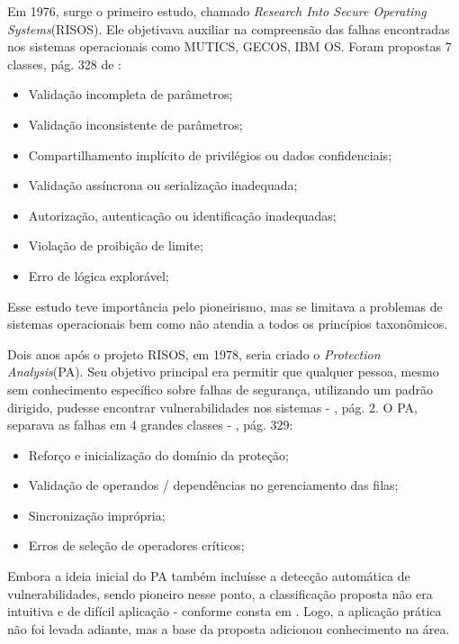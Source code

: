			Em 1976, surge o primeiro estudo, chamado \textsl{Research Into Secure Operating Systems}(RISOS).
			Ele objetivava auxiliar na compreensão das falhas encontradas nos sistemas operacionais
			como MUTICS, GECOS, IBM OS. Foram propostas 7 classes, pág. 328 de \cite{Gregio2005}:
			\begin{itemize}
				\item{Validação incompleta de parâmetros;}
				\item{Validação inconsistente de parâmetros;}
				\item{Compartilhamento implícito de privilégios ou dados confidenciais;}
				\item{Validação assíncrona ou serialização inadequada;}
				\item{Autorização, autenticação ou identificação inadequadas;}
				\item{Violação de proibição de limite;}
				\item{Erro de lógica explorável;}
			\end{itemize}
			Esse estudo teve importância pelo pioneirismo, mas se limitava a problemas
			de sistemas operacionais bem como não atendia a todos os princípios taxonômicos.

	
			Dois anos após o projeto RISOS, em 1978, seria criado o \textsl{Protection Analysis}(PA).
			Seu objetivo principal era permitir que qualquer pessoa, mesmo sem conhecimento
			específico sobre falhas de segurança, utilizando um padrão dirigido, pudesse
			encontrar vulnerabilidades nos sistemas - \cite{Katrina2005}, pág. 2.
			O PA, separava as falhas em 4 grandes classes - \cite{Gregio2005}, pág. 329:
			\begin{itemize}
				\item{Reforço e inicialização do domínio da proteção;}
				\item{Validação de operandos / dependências no gerenciamento das filas;}
				\item{Sincronização imprópria;}
				\item{Erros de seleção de operadores críticos;}
			\end{itemize}
			Embora a ideia inicial do PA também incluísse a detecção automática de vulnerabilidades,
			sendo pioneiro nesse ponto, a classificação proposta não era intuitiva e de difícil aplicação -
			conforme consta em \cite{Katrina2005}. Logo, a aplicação prática não foi levada adiante, mas
			a base da proposta adicionou conhecimento na área.


